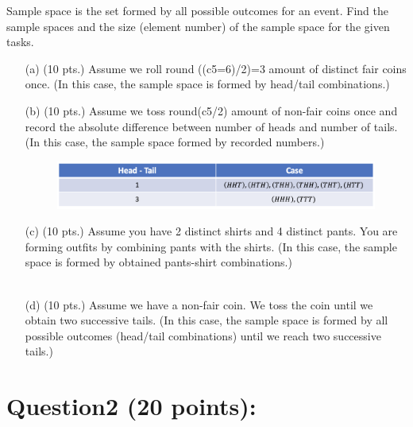 \documentclass[a4paper, 11pt]{report}
\begin{document}
{Sample space is the set formed by all possible outcomes for an event. Find the sample spaces
and the size (element number) of the sample space for the given tasks.
\begin{enumerate}
\item[(a)] (10 pts.) Assume we roll round ((c5=6)/2)=3 amount of distinct fair coins once. (In this case,
the sample space is formed by head/tail combinations.)
{\color{blue}{
\begin{align*}
S=\lbrace (HHH),(TTT),(HHT),(THH),(HTH),(TTH),(THT),(HTT)\rbrace
\end{align*}}}
\item[(b)] (10 pts.) Assume we toss round(c5/2) amount of non-fair coins once and record the absolute difference between number of heads and number of tails. (In this case, the sample space formed by recorded numbers.)
\begin{figure}[h]
\includegraphics[scale=.57]{1.png}
\centering
\caption{{\color{blue}{$S=\lbrace 1,3 \rbrace$}}}
\end{figure}
\item[(c)] (10 pts.) Assume you have 2 distinct shirts and 4 distinct pants. You are forming outfits by combining pants with the shirts. (In this case, the sample space is formed by obtained pants-shirt combinations.) \\ \\
{\color{blue}{2 distinct shirts = R and A \\ 4 distinct pants = M, D, H, E
\begin{align*}
S = \lbrace (RH), (RM), (RE), (RD), (AH), (AM), (AE), (AD) \rbrace
\end{align*}}}
\item[(d)] (10 pts.) Assume we have a non-fair coin. We toss the coin until we obtain two successive tails. (In this case, the sample space is formed by all possible outcomes (head/tail combinations) until we reach two successive tails.)
{\color{blue}{
\begin{align*}
S = \lbrace (TT), (HTT), (HHTT), (HTHTT), (THTHTT), (HHHTT), ... , (THHTT) \rbrace
\end{align*}}}
\end{enumerate}
\newpage
\section*{\textbf{Question2 (20 points):}}

}
\end{document}
